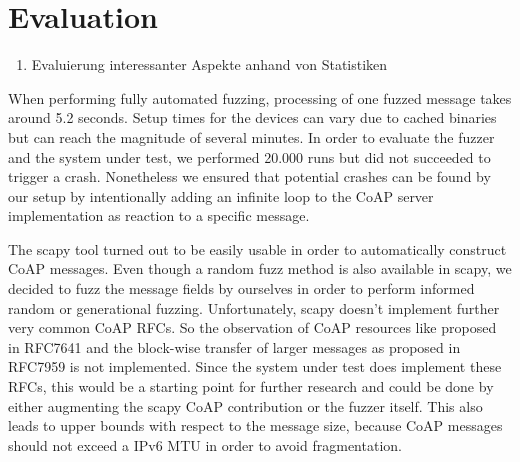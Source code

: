 \section{Evaluation}

\begin{enumerate}
	\item Evaluierung interessanter Aspekte anhand von Statistiken
\end{enumerate}

When performing fully automated fuzzing, processing of one fuzzed message takes around 5.2 seconds. Setup times for the devices can vary due to cached binaries but can reach the magnitude of several minutes. In order to evaluate the fuzzer and the system under test, we performed 20.000 runs but did not succeeded to trigger a crash. Nonetheless we ensured that potential crashes can be found by our setup by intentionally adding an infinite loop to the CoAP server implementation as reaction to a specific message.  

The scapy tool turned out to be easily usable in order to automatically construct CoAP messages. Even though a random fuzz method is also available in scapy, we decided to fuzz the message fields by ourselves in order to perform informed random or generational fuzzing. Unfortunately, scapy doesn't implement further very common CoAP RFCs. So the observation of CoAP resources like proposed in RFC7641 and the block-wise transfer of larger messages as proposed in RFC7959 is not implemented. Since the system under test does implement these RFCs, this would be a starting point for further research and could be done by either augmenting the scapy CoAP contribution or the fuzzer itself. This also leads to upper bounds with respect to the message size, because CoAP messages should not exceed a IPv6 MTU in order to avoid fragmentation. 

